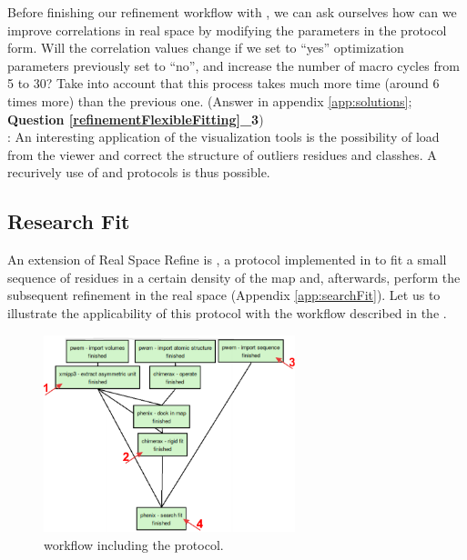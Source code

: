   Before finishing our refinement workflow with , we can ask ourselves how can we improve correlations in real space by modifying the  parameters in the protocol form. Will the correlation values change if we set to ``yes'' optimization parameters previously set to ``no'', and increase the number of macro cycles from 5 to 30? Take into account that this process takes much more time (around 6 times more) than the previous one. (Answer in appendix \ref{app:solutions}; \textbf{Question \ref{refinementFlexibleFitting}\_3})\\
  
  : An interesting application of the \phenix {} visualization tools is the possibility of load \coot from the \phenix viewer and correct the structure of outliers residues and classhes. A recurively use of \phenix {} and \coot protocols is thus possible.
  
  \subsection*{\phenix Research Fit}
  
  An extension of \phenix Real Space Refine is , a protocol implemented in \scipion to fit a small sequence of residues in a certain density of the map and, afterwards, perform the subsequent refinement in the real space (Appendix \ref{app:searchFit}). Let us to illustrate the applicability of this protocol with the workflow described in the .
  
   \begin{figure}[H]
  \centering 
  \captionsetup{width=.9\linewidth} 
  \includegraphics[width=0.65\textwidth]{Images/Fig_search_fit_1.pdf}
  \caption{\scipion workflow including the  protocol.}
  \label{fig:phenix_search_fit_1}
  \end{figure}
  
